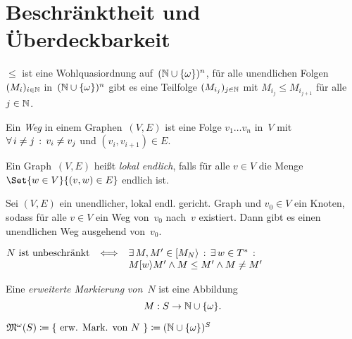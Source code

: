 \documentclass{cheat-sheet}
\newcommand{\activeTransition}[1]{[{#1}\rangle} %
\newcommand{\ExtMarkings}{\mathfrak{M}^\omega} %
\begin{document}
\section{Beschränktheit und Überdeckbarkeit}

\begin{lem}
  $\leq$ ist eine Wohlquasiordnung auf~$(\mathbb{N} \cup \{ \omega \})^n$, \dh{} für alle unendlichen Folgen $(M_i)_{i \in \mathbb{N}}$ in~$(\mathbb{N} \cup \{ \omega \})^n$ gibt es eine Teilfolge $(M_{i_j})_{j \in \mathbb{N}}$ mit $M_{i_j} \leq M_{i_{j+1}}$ für alle $j \in \mathbb{N}$.
\end{lem}

\begin{defn}
  Ein \emph{Weg} in einem Graphen~$(V, E)$ ist eine Folge $v_1 \ldots v_n$ in~$V$ mit $\forall \, {i \neq j} \,:\, v_i \neq v_j$ und $(v_i, v_{i+1}) \in E$.
\end{defn}

\begin{defn}
  Ein Graph~$(V, E)$ heißt \emph{lokal endlich}, falls für alle $v \in V$ die Menge $\Set{w \in V}{(v, w) \in E}$ endlich ist.
\end{defn}

\begin{lem}
  Sei $(V, E)$ ein unendlicher, lokal endl. gericht. Graph und $v_0 \in V$ ein Knoten, sodass für alle $v \in V$ ein Weg von~$v_0$ nach~$v$ existiert. 
  Dann gibt es einen unendlichen Weg ausgehend von~$v_0$.
\end{lem}

\begin{satz}
  $
    N \text{ ist unbeschränkt} \enspace \iff
    \begin{array}[t]{l}
      \ex{M, M' \in \activeTransition{M_N}} \ex{w \in T^*} \\
      M \activeTransition{w} M' \wedge M \leq M' \wedge M \neq M'
    \end{array}
  $
\end{satz}

\begin{defn}
  Eine \emph{erweiterte Markierung} \textit{von~$N$} ist eine Abbildung
  \[
    M : S \to \mathbb{N} \cup \{ \omega \}.
  \]
\end{defn}

\begin{nota}
  $\ExtMarkings(S) \coloneqq \{ \text{ erw. Mark. von~$N$ } \} \coloneqq (\N \cup \{ \omega \})^S$
\end{nota}
\end{document}
